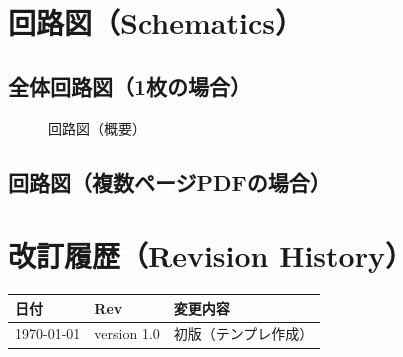 \documentclass[autodetect-engine,11pt,a4paper,ja=standard]{bxjsarticle}
\newcommand{\DocRevision}{version 1.0}
\newcommand{\DocDate}{\today}
\begin{document}
\section{回路図（Schematics）}

\subsection{全体回路図（1枚の場合）}
\begin{figure}[h]
	\centering
	\caption{回路図（概要）}
\end{figure}

\subsection{回路図（複数ページPDFの場合）}
% 

\section{改訂履歴（Revision History）}
\begin{tabularx}{\linewidth}{@{}l l X@{}}
\toprule
日付 & Rev & 変更内容 \\
\midrule
\DocDate & \DocRevision & 初版（テンプレ作成） \\
\bottomrule
\end{tabularx}
\end{document}
